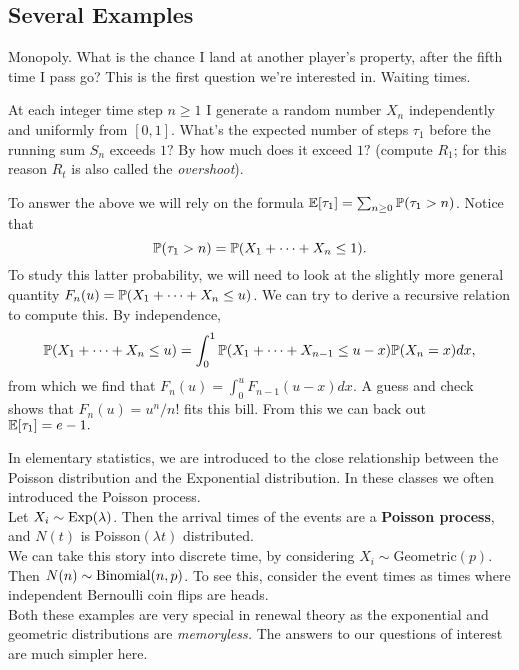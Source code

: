 \documentclass[12pt]{article}
\begin{document}
\subsection{Several Examples}

\begin{example}
Monopoly. What is the chance I land at another player's property, after the fifth time I pass go? This is the first question we're interested in. Waiting times.
\end{example}

\begin{example}
At each integer time step $n \geq 1$ I generate a random number $X_n$ independently and uniformly from $[0,1]$. What's the expected number of steps $\tau_1$ before the running sum $S_{n}$ exceeds $1?$ By how much does it exceed $1?$ (compute $R_1$; for this reason $R_t$ is also called the \textit{overshoot}).
\end{example}

To answer the above we will rely on the formula $\mathbb{E}[\tau_1] = \sum_{n \geq 0} \mathbb{P}(\tau_1 > n)$. Notice that 
\[
\mathbb{P}(\tau_1 > n) = \mathbb{P}(X_1 + \dots + X_n \leq 1). 
\]
To study this latter probability, we will need to look at the slightly more general quantity $F_n(u) = \mathbb{P}(X_1 + \dots + X_n \leq u) $. We can try to derive a recursive relation to compute this. By independence,
\[
\mathbb{P}(X_1 + \dots + X_n \leq u) = \int_0^1 \mathbb{P}(X_1 + \dots + X_{n-1} \leq u - x) \mathbb{P}(X_n = x) dx,
\]
from which we find that $F_n(u) = \int_0^u F_{n-1}(u - x) dx$. A guess and check shows that $F_n(u) = u^{n}/n!$ fits this bill. From this we can back out $\mathbb{E}[\tau_1] = e-1.$

\begin{example}
In elementary statistics, we are introduced to the close relationship between the Poisson distribution and the Exponential distribution. In these classes we often introduced the Poisson process. \\

Let $X_i \sim \operatorname{Exp}(\lambda)$. Then the arrival times of the events are a \textbf{Poisson process}, and $N(t)$ is Poisson$(\lambda t)$ distributed. \\


We can take this story into discrete time, by considering $X_i \sim \text{Geometric}(p)$. Then $N(n) \sim \operatorname{Binomial}(n,p)$.  To see this, consider the event times as times where independent Bernoulli coin flips are heads. \\

Both these examples are very special in renewal theory as the exponential and geometric distributions are \textit{memoryless.} The answers to our questions of interest are much simpler here.

\end{example}
\end{document}
